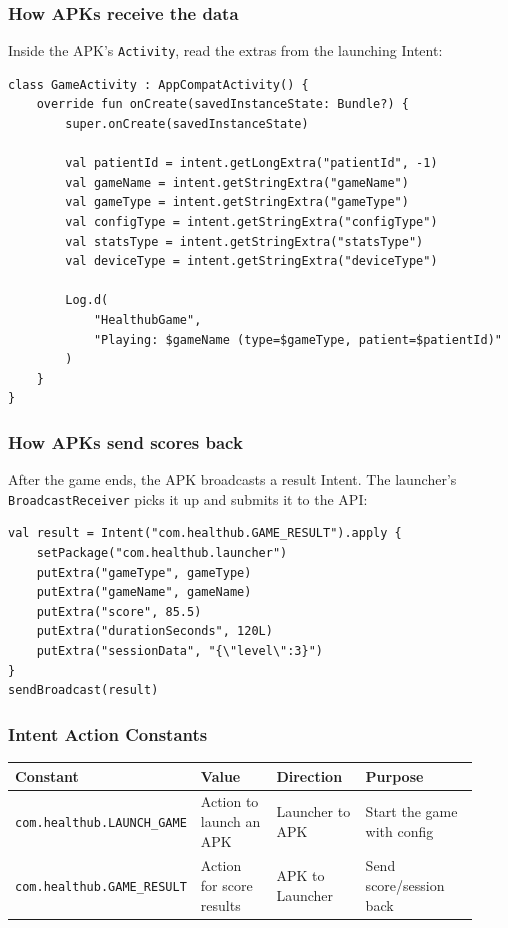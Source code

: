 \subsubsection{How APKs receive the
data}\label{how-apks-receive-the-data}

Inside the APK's \texttt{Activity}, read the extras from the launching
Intent:

\begin{lstlisting}
class GameActivity : AppCompatActivity() {
    override fun onCreate(savedInstanceState: Bundle?) {
        super.onCreate(savedInstanceState)

        val patientId = intent.getLongExtra("patientId", -1)
        val gameName = intent.getStringExtra("gameName")
        val gameType = intent.getStringExtra("gameType")
        val configType = intent.getStringExtra("configType")
        val statsType = intent.getStringExtra("statsType")
        val deviceType = intent.getStringExtra("deviceType")

        Log.d(
            "HealthubGame",
            "Playing: $gameName (type=$gameType, patient=$patientId)"
        )
    }
}
\end{lstlisting}

\subsubsection{How APKs send scores
back}\label{how-apks-send-scores-back}

After the game ends, the APK broadcasts a result Intent. The launcher's
\texttt{BroadcastReceiver} picks it up and submits it to the API:

\begin{lstlisting}
val result = Intent("com.healthub.GAME_RESULT").apply {
    setPackage("com.healthub.launcher")
    putExtra("gameType", gameType)
    putExtra("gameName", gameName)
    putExtra("score", 85.5)
    putExtra("durationSeconds", 120L)
    putExtra("sessionData", "{\"level\":3}")
}
sendBroadcast(result)
\end{lstlisting}

\subsubsection{Intent Action Constants}\label{intent-action-constants}

\begin{longtable}{p{0.28\linewidth}p{0.18\linewidth}p{0.20\linewidth}p{0.26\linewidth}}
\toprule
Constant & Value & Direction & Purpose \\
\midrule
\endhead
\bottomrule
\endlastfoot
\texttt{com.healthub.LAUNCH\_GAME} & Action to launch an APK & Launcher to APK & Start the game with config \\
\texttt{com.healthub.GAME\_RESULT} & Action for score results & APK to Launcher & Send score/session back \\
\end{longtable}

